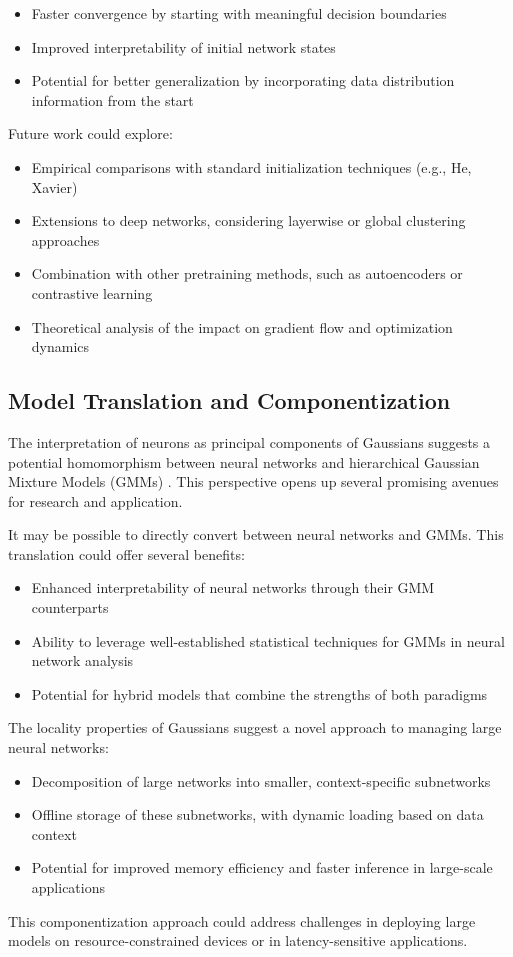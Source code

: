 \begin{itemize}
    \item Faster convergence by starting with meaningful decision boundaries
    \item Improved interpretability of initial network states
    \item Potential for better generalization by incorporating data distribution information from the start
\end{itemize}

Future work could explore:
\begin{itemize}
    \item Empirical comparisons with standard initialization techniques (e.g., He, Xavier)
    \item Extensions to deep networks, considering layerwise or global clustering approaches
    \item Combination with other pretraining methods, such as autoencoders or contrastive learning
    \item Theoretical analysis of the impact on gradient flow and optimization dynamics
\end{itemize}

\subsection{Model Translation and Componentization}

The interpretation of neurons as principal components of Gaussians suggests a potential homomorphism between neural networks and hierarchical Gaussian Mixture Models (GMMs) \citep{jacobs1991adaptive}. This perspective opens up several promising avenues for research and application.

It may be possible to directly convert between neural networks and GMMs. This translation could offer several benefits:

\begin{itemize}
    \item Enhanced interpretability of neural networks through their GMM counterparts
    \item Ability to leverage well-established statistical techniques for GMMs in neural network analysis
    \item Potential for hybrid models that combine the strengths of both paradigms
\end{itemize}

The locality properties of Gaussians suggest a novel approach to managing large neural networks:

\begin{itemize}
    \item Decomposition of large networks into smaller, context-specific subnetworks
    \item Offline storage of these subnetworks, with dynamic loading based on data context
    \item Potential for improved memory efficiency and faster inference in large-scale applications
\end{itemize}

This componentization approach could address challenges in deploying large models on resource-constrained devices or in latency-sensitive applications.
